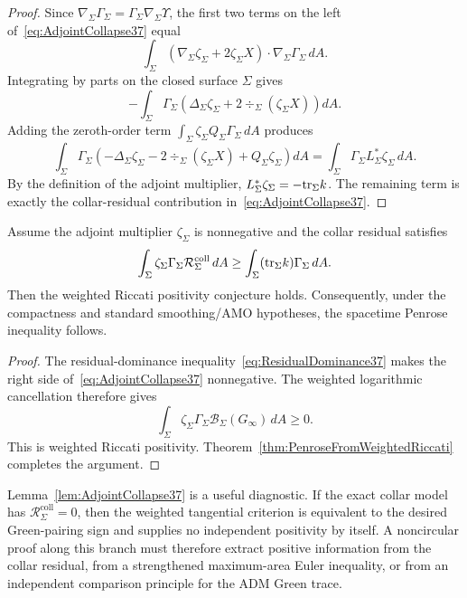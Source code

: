 \begin{proof}
Since \(\nabla_\Sigma\Gamma_\Sigma=\Gamma_\Sigma\nabla_\Sigma\Upsilon\), the first two terms on the left of~\eqref{eq:AdjointCollapse37} equal
\[
    \int_\Sigma
    \left(\nabla_\Sigma\zeta_\Sigma+2\zeta_\Sigma X\right)\cdot\nabla_\Sigma\Gamma_\Sigma\,dA .
\]
Integrating by parts on the closed surface \(\Sigma\) gives
\[
    -\int_\Sigma \Gamma_\Sigma
    \left(\Delta_\Sigma\zeta_\Sigma+2\div_\Sigma(\zeta_\Sigma X)\right)dA .
\]
Adding the zeroth-order term \(\int_\Sigma\zeta_\Sigma Q_\Sigma\Gamma_\Sigma\,dA\) produces
\[
    \int_\Sigma \Gamma_\Sigma
    \left(-\Delta_\Sigma\zeta_\Sigma-2\div_\Sigma(\zeta_\Sigma X)+Q_\Sigma\zeta_\Sigma\right)dA
    =
    \int_\Sigma \Gamma_\Sigma L_\Sigma^*\zeta_\Sigma\,dA .
\]
By the definition of the adjoint multiplier, \(L_\Sigma^*\zeta_\Sigma=-\mathrm{tr}_\Sigma k\). The remaining term is exactly the collar-residual contribution in~\eqref{eq:AdjointCollapse37}.
\end{proof}

\begin{proposition}\label{prop:ResidualDominanceClosure}
Assume the adjoint multiplier \(\zeta_\Sigma\) is nonnegative and the collar residual satisfies
\begin{equation}\label{eq:ResidualDominance37}
    \int_\Sigma \zeta_\Sigma\Gamma_\Sigma
        \mathcal R_\Sigma^{\mathrm{coll}}\,dA
    \ge
    \int_\Sigma (\mathrm{tr}_\Sigma k)\Gamma_\Sigma\,dA .
\end{equation}
Then the weighted Riccati positivity conjecture holds. Consequently, under the compactness and standard smoothing/AMO hypotheses, the spacetime Penrose inequality follows.
\end{proposition}

\begin{proof}
The residual-dominance inequality~\eqref{eq:ResidualDominance37} makes the right side of~\eqref{eq:AdjointCollapse37} nonnegative. The weighted logarithmic cancellation therefore gives
\[
    \int_\Sigma \zeta_\Sigma\Gamma_\Sigma
    \mathcal B_\Sigma(G_\infty)\,dA\ge0 .
\]
This is weighted Riccati positivity. Theorem~\ref{thm:PenroseFromWeightedRiccati} completes the argument.
\end{proof}

\begin{remark}\label{rem:NonCircularTarget37}
Lemma~\ref{lem:AdjointCollapse37} is a useful diagnostic. If the exact collar model has \(\mathcal R_\Sigma^{\mathrm{coll}}=0\), then the weighted tangential criterion is equivalent to the desired Green-pairing sign and supplies no independent positivity by itself. A noncircular proof along this branch must therefore extract positive information from the collar residual, from a strengthened maximum-area Euler inequality, or from an independent comparison principle for the ADM Green trace.
\end{remark}

